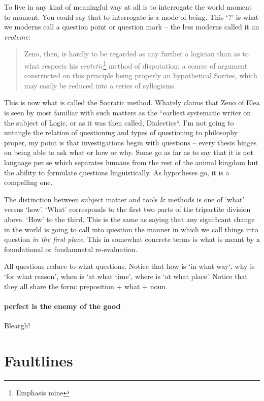 \documentclass[dah,phd,a4paper]{xe_uccthesis}
\begin{document}
To live in any kind of meaningful way at all is to interrogate the world moment to moment. You could say that to interrogate is a mode of being. This ‘?’ is what we moderns call a question point or question mark -- the less moderns called it an \emph{eroteme}:
\begin{quotation}
Zeno, then, is hardly to be regarded as any further a logician than as to what respects his \emph{erotetic}\footnote{Emphasis mine} method of disputation; a course of argument constructed on this principle being properly an hypothetical Sorites, which may easily be reduced into a series of syllogisms.
\begin{flushright}
\citep{whately_elements_1845}
\end{flushright}
\end{quotation}
This is now what is called the Socratic method. Whately claims that Zeno of Elea is seen by most familiar with such matters as the “earliest systematic writer on the subject of Logic, or as it was then called, Dialectics“. I'm not going to untangle the relation of questioning and types of questioning to philosophy proper, my point is that investigations begin with questions -- every thesis hinges on being able to ask what or how or why. Some go as far as to say that it is not language per se which separates humans from the rest of the animal kingdom but the ability to formulate questions linguistically. As hypotheses go, it is a compelling one.

The distinction between subject matter and tools \& methods is one of ‘what’ versus ‘how’. ‘What’ corresponds to the first two parts of the tripartite division above. ‘How’ to the third. This is the same as saying that any significant change in the world is going to call into question the manner in which we call things into question \emph{in the first place}. This in somewhat concrete terms is what is meant by a foundational or fundamnetal re-evaluation.

All questions reduce to what questions. Notice that how is ‘in what way‘, why is ‘for what reason’, when is ‘at what time’, where is ‘at what place’. Notice that they all share the form: preposition + what + noun.

\subsubsection{perfect is the enemy of the good}

	Bleargh!
	
\chapter{Faultlines}
\end{document}
